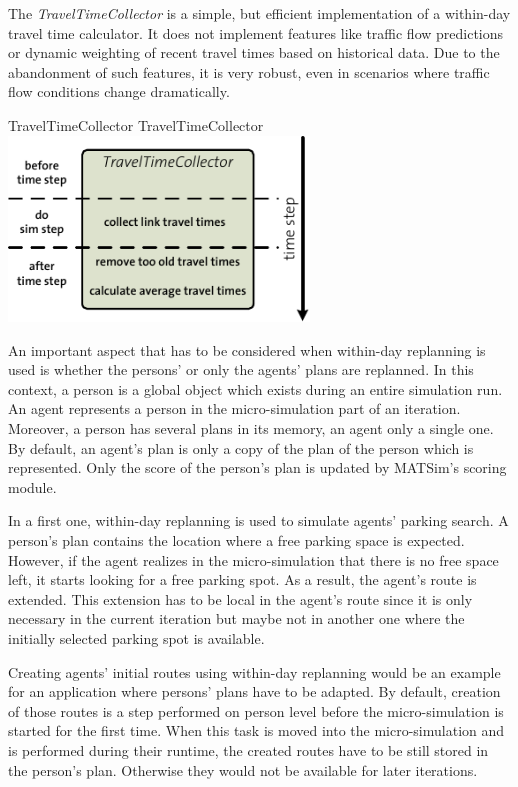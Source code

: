 The \emph{TravelTimeCollector} is a simple, but efficient implementation of a within-day travel time calculator. It does not implement features like traffic flow predictions or dynamic weighting of recent travel times based on historical data. Due to the abandonment of such features, it is very robust, even in scenarios where traffic flow conditions change dramatically.

\createfigure%
{TravelTimeCollector}%
{TravelTimeCollector}%
{\label{fig:labelTravelTimeCollector}}%
{\includegraphics[width=8.0cm, angle=0]{extending/figures/WithinDayReplanning/TravelTimeCollector}}%
{}

An important aspect that has to be considered when within-day replanning is used is whether the persons' or only the agents' plans are replanned. In this context, a person is a global object which exists during an entire simulation run. An agent represents a person in the micro-simulation part of an iteration. Moreover, a person has several plans in its memory, an agent only a single one. By default, an agent's plan is only a copy of the plan of the person which is represented. Only the score of the person's plan is updated by MATSim's scoring module. 

In a first one, within-day replanning is used to simulate agents' parking search. A person's plan contains the location where a free parking space is expected. However, if the agent realizes in the micro-simulation that there is no free space left, it starts looking for a free parking spot. As a result, the agent's route is extended. This extension has to be local in the agent's route since it is only necessary in the current iteration
but maybe not in another one where the initially selected parking spot is available.

Creating agents' initial routes using within-day replanning would be an example for an application where persons' plans have to be adapted. By default, creation of those routes is a step performed on person level before the micro-simulation is started for the first time. When this task is moved into the micro-simulation and is performed during their runtime, the created routes have to be still stored in the person's plan. Otherwise they would not be available for later iterations.

